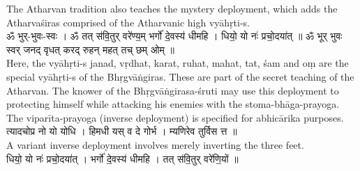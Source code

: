 \documentclass[12pt]{article}
\begin{document}
The Atharvan tradition also teaches the mystery deployment, which adds the Atharvaśiras comprised of the Atharvanic high vyāhṛti-s.\\[8pt]
{\skt 
ॐ भुर्-भुवः-स्वः । ॐ तत् स॑वि॒तुर् वरे॑ण्य॒म् भर्गो॑ दे॒वस्य॑ धीमहि । धियो॒ यो नः॑ प्रचो॒दया॑त् ॥ ॐ भूर् भुवः स्वर् जनद् वृधत् करद् रुहन् महत् तच् छम् ओम् ॥
}\\[8pt]
Here, the vyāhṛti-s janad, vṛdhat, karat, ruhat, mahat, tat, śam and oṃ are the special vyāhṛti-s of the Bhṛgvāṅgiras. These are part of the secret teaching of the Atharvan. The knower of the Bhṛgvāṅgirasa-śruti may use this deployment to protecting himself while attacking his enemies with the stoma-bhāga-prayoga.\\[10pt]
The viparīta-prayoga (inverse deployment) is specified for abhicārika purposes.\\
{\skt
त्यादचोप्र नो यो योधि । हिमधी यस् व दे गोर्भ । म्यणिरेव तुर्विस त्त ॥
}\\
A variant inverse deployment involves merely inverting the three feet.\\
{\skt
धियो॒ यो नः॑ प्रचो॒दया॑त् । भर्गो॑ दे॒वस्य॑ धीमहि । तत् स॑वि॒तुर् वरे॑णि॒यों ॥
}
\end{document}
